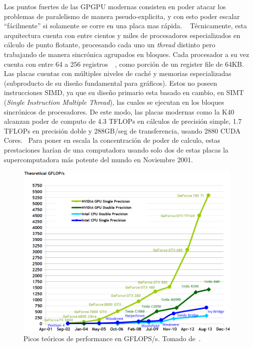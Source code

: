 Los puntos fuertes de las GPGPU modernas consisten en poder atacar los problemas de paralelismo
de manera pseudo-explicita, y con esto poder escalar ``f\'acilmente'' si solamente se corre en una
placa mas r\'apida. ~\cite{} T\'ecnicamente, esta arquitectura cuenta con entre cientos y miles de procesadores
especializados en c\'alculo de punto flotante, procesando cada uno un \textit{thread} distinto pero
trabajando de manera sincr\'onica agrupados en bloques. Cada procesador a su vez cuenta con entre
64 a 256 registros~\cite{NvidiaFermi}~\cite{NvidiaKepler}, como porci\'on de un register file de 64KB.
Las placas cuentas con m\'ultiples niveles de cach\'e y memorias especializadas (subproducto de
su dise\~no fundamental para gr\'aficos). Estos no poseen instrucciones SIMD, ya que su dise\~no primario
esta basado en cambio, en SIMT (\textit{Single Instruction Multiple Thread}), las cuales se ejecutan en los
bloques sincr\'onicos de procesadores. De este modo, las placas modernas como la K40 alcanzan
poder de computo de 4.3 TFLOPs en c\'alculos de precisi\'on simple, 1.7 TFLOPs en precisi\'on doble y 288GB/seg de
transferencia, usando 2880 CUDA Cores.~\cite{NvidiaKeplerDatasheet} Para poner en escala la concentraci\'on
de poder de calculo, estas prestaciones har\'ian de una computadora usando solo dos de estas placas
la supercomputadora m\'as potente del mundo en Noviembre 2001.~\cite{Top500November2001}

\begin{figure}[htbp]
    \centering
    \includegraphics[width=\plotwidth]{images/cuda-gflops.png}
    \caption{Picos te\'oricos de performance en GFLOPS/s. Tomado de~\cite{cudaProgrammingGuide}.}
    \label{cuda-gflops}
\end{figure}

